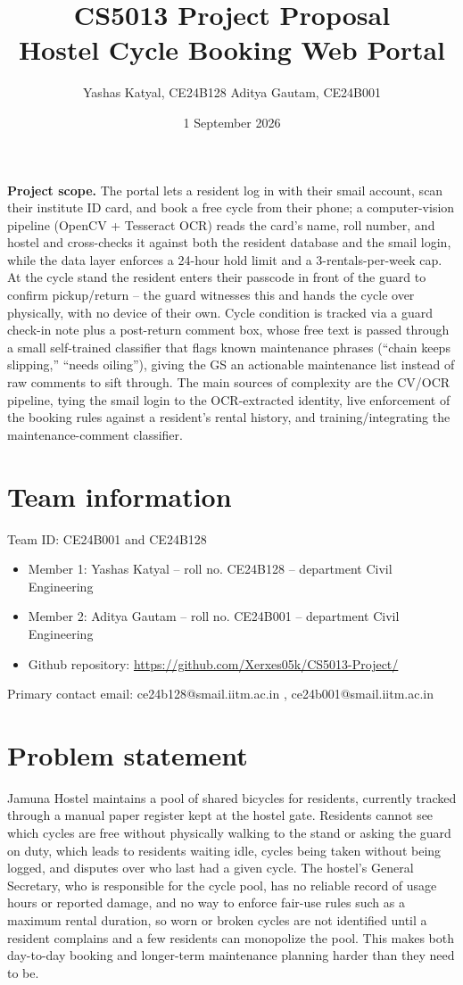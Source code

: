 \documentclass[11pt]{article}
\title{CS5013 Project Proposal \\ \large Hostel Cycle Booking Web Portal}
\author{Yashas Katyal, CE24B128 \qquad Aditya Gautam, CE24B001}
\date{1 September 2026}
\begin{document}
\maketitle

\noindent\textbf{Project scope.} The portal lets a resident log in with their smail account, scan their institute ID card, and book a free cycle from their phone; a computer-vision pipeline (OpenCV + Tesseract OCR) reads the card's name, roll number, and hostel and cross-checks it against both the resident database and the smail login, while the data layer enforces a 24-hour hold limit and a 3-rentals-per-week cap. At the cycle stand the resident enters their passcode in front of the guard to confirm pickup/return -- the guard witnesses this and hands the cycle over physically, with no device of their own. Cycle condition is tracked via a guard check-in note plus a post-return comment box, whose free text is passed through a small self-trained classifier that flags known maintenance phrases (``chain keeps slipping,'' ``needs oiling''), giving the GS an actionable maintenance list instead of raw comments to sift through. The main sources of complexity are the CV/OCR pipeline, tying the smail login to the OCR-extracted identity, live enforcement of the booking rules against a resident's rental history, and training/integrating the maintenance-comment classifier.

\section{Team information}
Team ID: CE24B001 and CE24B128 

\begin{itemize}[leftmargin=*]
  \item Member 1: Yashas Katyal -- roll no. CE24B128 -- department Civil Engineering 
  \item Member 2: Aditya Gautam -- roll no. CE24B001 -- department  Civil Engineering 
  \item Github repository: \url{https://github.com/Xerxes05k/CS5013-Project/}
\end{itemize}

Primary contact email: ce24b128@smail.iitm.ac.in , ce24b001@smail.iitm.ac.in


\section{Problem statement}
Jamuna Hostel maintains a pool of shared bicycles for residents, currently tracked through a manual paper register kept at the hostel gate. Residents cannot see which cycles are free without physically walking to the stand or asking the guard on duty, which leads to residents waiting idle, cycles being taken without being logged, and disputes over who last had a given cycle. The hostel's General Secretary, who is responsible for the cycle pool, has no reliable record of usage hours or reported damage, and no way to enforce fair-use rules such as a maximum rental duration, so worn or broken cycles are not identified until a resident complains and a few residents can monopolize the pool. This makes both day-to-day booking and longer-term maintenance planning harder than they need to be.
\end{document}
